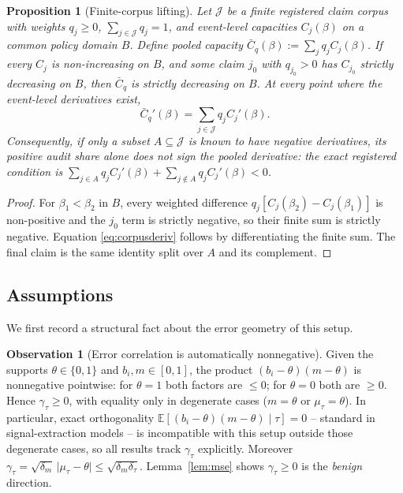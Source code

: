 \documentclass[11pt]{article}
\newtheorem{proposition}[theorem]{Proposition}
\theoremstyle{definition}
\newtheorem{observation}[theorem]{Observation}
\theoremstyle{remark}
\numberwithin{equation}{section}
\newcommand{\E}{\mathbb{E}}
\begin{document}
\begin{proposition}[Finite-corpus lifting]\label{prop:corpus}
Let $\mathcal J$ be a finite registered claim corpus with weights $q_j\ge0$,
$\sum_{j\in\mathcal J}q_j=1$, and event-level capacities $C_j(\beta)$ on a
common policy domain $B$. Define pooled capacity
$\bar C_q(\beta):=\sum_jq_jC_j(\beta)$. If every $C_j$ is non-increasing on
$B$, and some claim $j_0$ with $q_{j_0}>0$ has $C_{j_0}$ strictly decreasing
on $B$, then $\bar C_q$ is strictly decreasing on $B$. At every point where
the event-level derivatives exist,
\begin{equation}\label{eq:corpusderiv}
\bar C_q'(\beta)=\sum_{j\in\mathcal J}q_jC_j'(\beta).
\end{equation}
Consequently, if only a subset $A\subseteq\mathcal J$ is known to have
negative derivatives, its positive audit share alone does not sign the pooled
derivative: the exact registered condition is
$\sum_{j\in A}q_jC_j'(\beta)+\sum_{j\notin A}q_jC_j'(\beta)<0$.
\end{proposition}
\begin{proof}
For $\beta_1<\beta_2$ in $B$, every weighted difference
$q_j[C_j(\beta_2)-C_j(\beta_1)]$ is non-positive and the $j_0$ term is
strictly negative, so their finite sum is strictly negative. Equation
\eqref{eq:corpusderiv} follows by differentiating the finite sum. The final
claim is the same identity split over $A$ and its complement.
\end{proof}

\subsection{Assumptions}\label{sec:assumptions}

We first record a structural fact about the error geometry of this setup.

\begin{observation}[Error correlation is automatically nonnegative]\label{obs:gamma}
Given the supports $\theta \in \{0,1\}$ and $b_i, m \in [0,1]$, the product $(b_i-\theta)(m-\theta)$ is nonnegative pointwise: for $\theta = 1$ both factors are $\le 0$; for $\theta = 0$ both are $\ge 0$. Hence $\gamma_\tau \ge 0$, with equality only in degenerate cases ($m = \theta$ or $\mu_\tau = \theta$). In particular, exact orthogonality $\E[(b_i-\theta)(m-\theta) \mid \tau] = 0$ -- standard in signal-extraction models -- is incompatible with this setup outside those degenerate cases, so all results track $\gamma_\tau$ explicitly. Moreover $\gamma_\tau = \sqrt{\delta_m}\,\lvert \mu_\tau - \theta\rvert \le \sqrt{\delta_m \delta_\tau}$. Lemma~\ref{lem:mse} shows $\gamma_\tau \ge 0$ is the \emph{benign} direction.
\end{observation}
\end{document}
